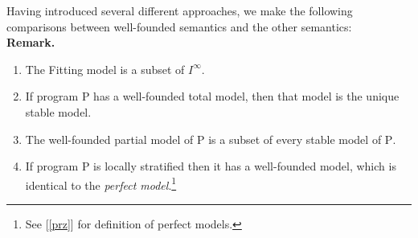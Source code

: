 Having introduced several different approaches, we make the following comparisons between well-founded semantics and the other semantics:
\medskip\\
\textbf{Remark.}
\begin{enumerate}[label=(\alph*)]
%
\item The Fitting model is a subset of $I^\infty$.
%
\item If program $\mathrm{P}$ has a well-founded total model, then that model is the unique stable model.
%
\item The well-founded partial model of $\mathrm{P}$ is a subset of every stable model of $\mathrm{P}$.
%
\item If program $\mathrm{P}$ is locally stratified then it has a well-founded model, which is identical to the \emph{perfect model}.\footnote{See [\ref{prz}] for definition of perfect models.}
%
\end{enumerate}